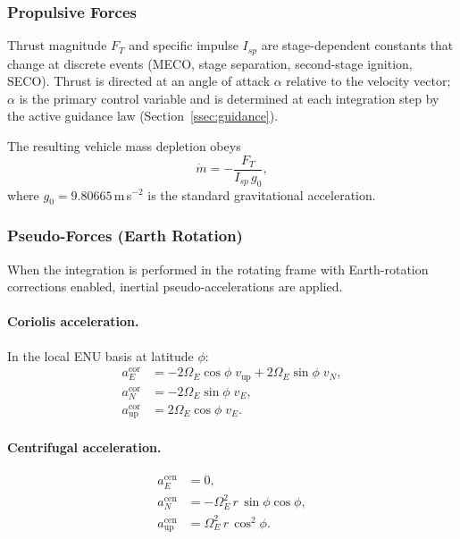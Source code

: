 \subsubsection{Propulsive Forces}
\label{sssec:propulsion}

Thrust magnitude $F_T$ and specific impulse $I_{sp}$ are stage-dependent
constants that change at discrete events (MECO, stage separation, second-stage
ignition, SECO).  Thrust is directed at an angle of attack $\alpha$ relative
to the velocity vector; $\alpha$ is the primary control variable and is
determined at each integration step by the active guidance law
(Section~\ref{ssec:guidance}).

The resulting vehicle mass depletion obeys
\begin{equation}
  \dot m = -\frac{F_T}{I_{sp}\,g_0},
  \label{eq:mdot_prop}
\end{equation}
where $g_0 = 9.80665$\,m\,s$^{-2}$ is the standard gravitational acceleration.

\subsubsection{Pseudo-Forces (Earth Rotation)}
\label{sssec:pseudo_forces}

When the integration is performed in the rotating frame with Earth-rotation
corrections enabled, inertial pseudo-accelerations are applied.

\paragraph{Coriolis acceleration.}
In the local ENU basis at latitude $\phi$:
\begin{align}
  a_E^{\text{cor}} &= -2\Omega_E\cos\phi\;v_{\text{up}}
                      + 2\Omega_E\sin\phi\;v_N,
                    \label{eq:cor_e} \\
  a_N^{\text{cor}} &= -2\Omega_E\sin\phi\;v_E,
                    \label{eq:cor_n} \\
  a_{\text{up}}^{\text{cor}} &= 2\Omega_E\cos\phi\;v_E.
                    \label{eq:cor_u}
\end{align}

\paragraph{Centrifugal acceleration.}
\begin{align}
  a_E^{\text{cen}} &= 0,
                    \label{eq:cen_e} \\
  a_N^{\text{cen}} &= -\Omega_E^2\,r\,\sin\phi\cos\phi,
                    \label{eq:cen_n} \\
  a_{\text{up}}^{\text{cen}} &= \Omega_E^2\,r\,\cos^2\!\phi.
                    \label{eq:cen_u}
\end{align}

